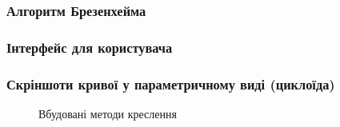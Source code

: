 \documentclass[a4paper,14pt]{extarticle} %
\begin{document}
\subsubsection*{Алгоритм Брезенхейма}


\newpage
\subsubsection*{Інтерфейс для користувача}


\subsubsection*{Скріншоти кривої у параметричному виді (циклоїда)}

\begin{figure}[H]
    \caption{Вбудовані методи креслення}
\end{figure}
\end{document}
